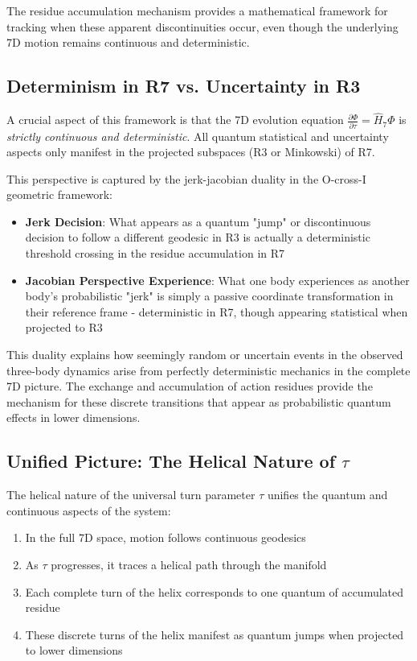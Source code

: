 \documentclass{article}
\begin{document}
The residue accumulation mechanism provides a mathematical framework for tracking when these apparent discontinuities occur, even though the underlying 7D motion remains continuous and deterministic.

\subsection{Determinism in R7 vs. Uncertainty in R3}

A crucial aspect of this framework is that the 7D evolution equation $\frac{\partial \Phi}{\partial \tau} = \hat{H}_7 \Phi$ is \textit{strictly continuous and deterministic}. All quantum statistical and uncertainty aspects only manifest in the projected subspaces (R3 or Minkowski) of R7.

This perspective is captured by the jerk-jacobian duality in the O-cross-I geometric framework:

\begin{itemize}
\item \textbf{Jerk Decision}: What appears as a quantum "jump" or discontinuous decision to follow a different geodesic in R3 is actually a deterministic threshold crossing in the residue accumulation in R7
  
\item \textbf{Jacobian Perspective Experience}: What one body experiences as another body's probabilistic "jerk" is simply a passive coordinate transformation in their reference frame - deterministic in R7, though appearing statistical when projected to R3
\end{itemize}

This duality explains how seemingly random or uncertain events in the observed three-body dynamics arise from perfectly deterministic mechanics in the complete 7D picture. The exchange and accumulation of action residues provide the mechanism for these discrete transitions that appear as probabilistic quantum effects in lower dimensions.

\subsection{Unified Picture: The Helical Nature of $\tau$}

The helical nature of the universal turn parameter $\tau$ unifies the quantum and continuous aspects of the system:

\begin{enumerate}
\item In the full 7D space, motion follows continuous geodesics
\item As $\tau$ progresses, it traces a helical path through the manifold
\item Each complete turn of the helix corresponds to one quantum of accumulated residue
\item These discrete turns of the helix manifest as quantum jumps when projected to lower dimensions
\end{enumerate}
\end{document}
